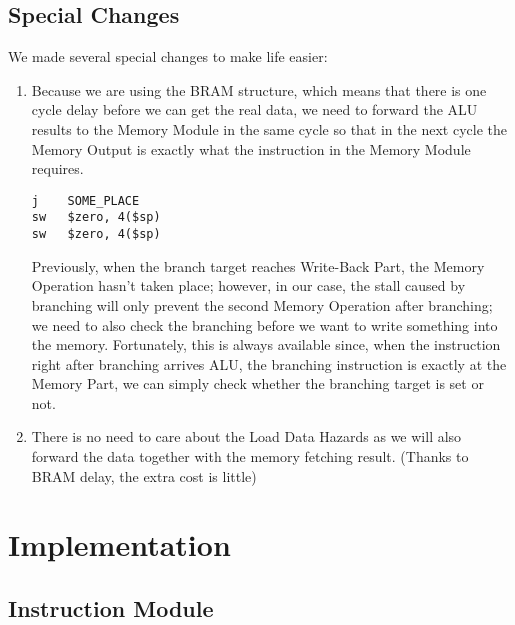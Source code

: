 \subsection{Special Changes}
We made several special changes to make life easier: 
\begin{enumerate}
	\item Because we are using the BRAM structure, which means that there is one cycle delay before we can get the real data, we need to forward the ALU results to the Memory Module in the same cycle so that in the next cycle the Memory Output is exactly what the instruction in the Memory Module requires.
	\begin{verbatim}
j    SOME_PLACE
sw   $zero, 4($sp)
sw   $zero, 4($sp)
	\end{verbatim}
	Previously, when the branch target reaches Write-Back Part, the Memory Operation hasn't taken place; however, in our case, the stall caused by branching will only prevent the second Memory Operation after branching; we need to also check the branching before we want to write something into the memory. Fortunately, this is always available since, when the instruction right after branching arrives ALU, the branching instruction is exactly at the Memory Part, we can simply check whether the branching target is set or not.
	\item There is no need to care about the Load Data Hazards as we will also forward the data together with the memory fetching result. (Thanks to BRAM delay, the extra cost is little)
\end{enumerate}
\section{Implementation}
\subsection{Instruction Module}

